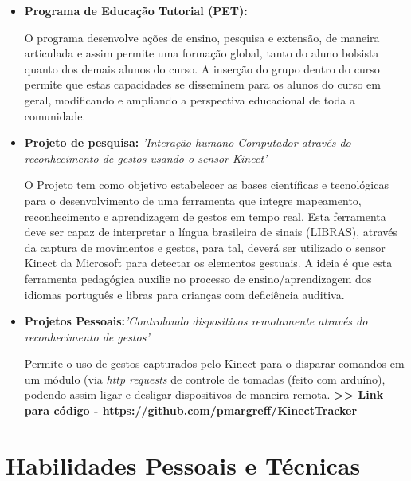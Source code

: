\documentclass[11pt,a4paper,sans]{moderncv}        %
\begin{document}
\begin{itemize}

\item{\textbf{Programa de Educação Tutorial (PET):} \textit{}

\vspace{3pt}

\small{O programa desenvolve ações de ensino, pesquisa e extensão, de maneira articulada e assim
permite uma formação global, tanto do aluno bolsista quanto dos demais alunos do curso. A inserção do grupo dentro
do curso permite que estas capacidades se disseminem para os alunos do curso em geral,
modificando e ampliando a perspectiva educacional de toda a comunidade.
}}

\item{\textbf{Projeto de pesquisa: } \textit{'Interação humano-Computador através do reconhecimento de gestos usando o sensor Kinect'}

\vspace{3pt}

\small{O Projeto tem como objetivo estabelecer as bases científicas e tecnológicas para o desenvolvimento de uma ferramenta que integre mapeamento, reconhecimento e aprendizagem de gestos em tempo real. Esta ferramenta deve ser capaz de interpretar a língua brasileira de sinais (LIBRAS), através da captura de movimentos e gestos, para tal, deverá ser utilizado o sensor Kinect da Microsoft para detectar os elementos gestuais. A ideia é que esta ferramenta pedagógica auxilie no processo de ensino/aprendizagem dos idiomas português e libras para crianças com deficiência auditiva.}}

\vspace{6pt}

\item{\textbf{Projetos Pessoais:}\textit{'Controlando dispositivos remotamente através do reconhecimento de gestos'}

\vspace{3pt}

\small{Permite o uso de gestos  capturados pelo Kinect para o disparar comandos em um módulo (via \textit{http requests} de controle de tomadas (feito com arduíno), podendo assim ligar e desligar dispositivos de maneira remota.
\textbf{ >> Link para código - \href{https://github.com/pmargreff/KinectTracker}{https://github.com/pmargreff/KinectTracker} }}
}
\end{itemize}
\section{Habilidades Pessoais e Técnicas}
\end{document}
